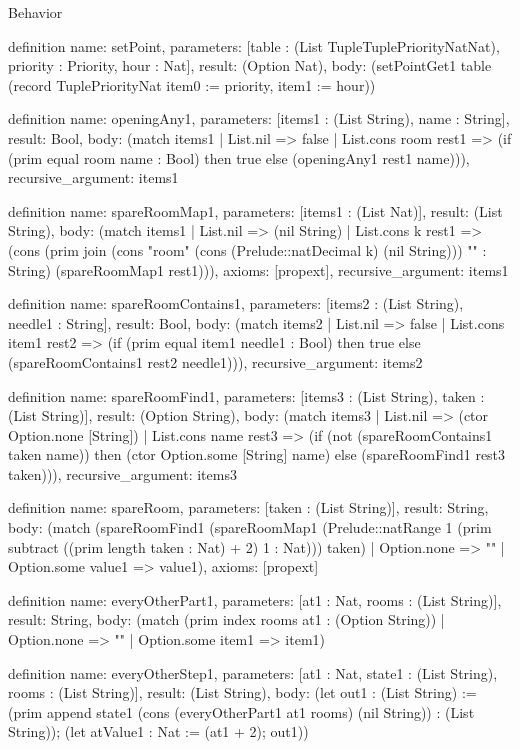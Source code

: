 \begin{lexlean}{Behavior}
\begin{semanticmodule}
definition{
  name: setPoint,
  parameters: [table : (List TupleTuplePriorityNatNat), priority : Priority, hour : Nat],
  result: (Option Nat),
  body: (setPointGet1 table (record TuplePriorityNat {item0 := priority, item1 := hour}))
}

definition{
  name: openingAny1,
  parameters: [items1 : (List String), name : String],
  result: Bool,
  body: (match items1
    | List.nil => false
    | List.cons room rest1 => (if (prim equal room name : Bool) then true else (openingAny1 rest1 name))),
  recursive_argument: items1
}

definition{
  name: spareRoomMap1,
  parameters: [items1 : (List Nat)],
  result: (List String),
  body: (match items1
    | List.nil => (nil String)
    | List.cons k rest1 => (cons (prim join (cons "room" (cons (Prelude::natDecimal k) (nil String))) "" : String) (spareRoomMap1 rest1))),
  axioms: [propext],
  recursive_argument: items1
}

definition{
  name: spareRoomContains1,
  parameters: [items2 : (List String), needle1 : String],
  result: Bool,
  body: (match items2
    | List.nil => false
    | List.cons item1 rest2 => (if (prim equal item1 needle1 : Bool) then true else (spareRoomContains1 rest2 needle1))),
  recursive_argument: items2
}

definition{
  name: spareRoomFind1,
  parameters: [items3 : (List String), taken : (List String)],
  result: (Option String),
  body: (match items3
    | List.nil => (ctor Option.none [String])
    | List.cons name rest3 => (if (not (spareRoomContains1 taken name)) then (ctor Option.some [String] name) else (spareRoomFind1 rest3 taken))),
  recursive_argument: items3
}

definition{
  name: spareRoom,
  parameters: [taken : (List String)],
  result: String,
  body: (match (spareRoomFind1 (spareRoomMap1 (Prelude::natRange 1 (prim subtract ((prim length taken : Nat) + 2) 1 : Nat))) taken)
    | Option.none => ""
    | Option.some value1 => value1),
  axioms: [propext]
}

definition{
  name: everyOtherPart1,
  parameters: [at1 : Nat, rooms : (List String)],
  result: String,
  body: (match (prim index rooms at1 : (Option String))
    | Option.none => ""
    | Option.some item1 => item1)
}

definition{
  name: everyOtherStep1,
  parameters: [at1 : Nat, state1 : (List String), rooms : (List String)],
  result: (List String),
  body: (let out1 : (List String) := (prim append state1 (cons (everyOtherPart1 at1 rooms) (nil String)) : (List String)); (let atValue1 : Nat := (at1 + 2); out1))
}


\end{semanticmodule}
\end{lexlean}
